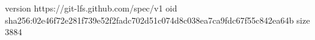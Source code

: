 version https://git-lfs.github.com/spec/v1
oid sha256:02e46f72e281f739e52f2fadc702d51c074d8c038ea7ca9fdc67f55c842ea64b
size 3884

